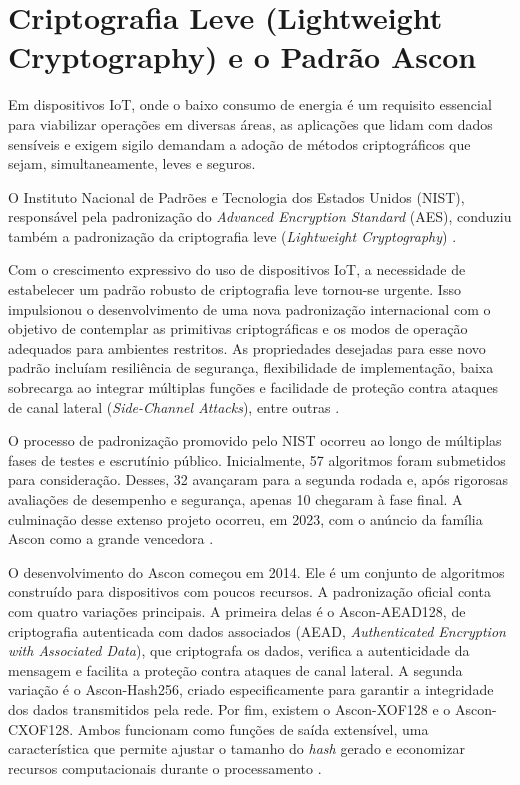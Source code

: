 \section{Criptografia Leve (Lightweight Cryptography) e o Padrão Ascon}
Em dispositivos IoT, onde o baixo consumo de energia é um requisito essencial para viabilizar operações em diversas áreas, as aplicações que lidam com dados sensíveis e exigem sigilo demandam a adoção de métodos criptográficos que sejam, simultaneamente, leves e seguros.

O Instituto Nacional de Padrões e Tecnologia dos Estados Unidos (NIST), responsável pela padronização do \textit{Advanced Encryption Standard} (AES), conduziu também a padronização da criptografia leve (\textit{Lightweight Cryptography}) \cite{chen2022cornerstone}.

Com o crescimento expressivo do uso de dispositivos IoT, a necessidade de estabelecer um padrão robusto de criptografia leve tornou-se urgente. Isso impulsionou o desenvolvimento de uma nova padronização internacional com o objetivo de contemplar as primitivas criptográficas e os modos de operação adequados para ambientes restritos. As propriedades desejadas para esse novo padrão incluíam resiliência de segurança, flexibilidade de implementação, baixa sobrecarga ao integrar múltiplas funções e facilidade de proteção contra ataques de canal lateral (\textit{Side-Channel Attacks}), entre outras \cite{nistir8114}.

O processo de padronização promovido pelo NIST ocorreu ao longo de múltiplas fases de testes e escrutínio público. Inicialmente, 57 algoritmos foram submetidos para consideração. Desses, 32 avançaram para a segunda rodada e, após rigorosas avaliações de desempenho e segurança, apenas 10 chegaram à fase final. A culminação desse extenso projeto ocorreu, em 2023, com o anúncio da família Ascon como a grande vencedora \cite{nistir8454}.

O desenvolvimento do Ascon começou em 2014. Ele é um conjunto de algoritmos construído para dispositivos com poucos recursos. A padronização oficial conta com quatro variações principais. A primeira delas é o Ascon-AEAD128, de criptografia autenticada com dados associados (AEAD, \textit{Authenticated Encryption with Associated Data}), que criptografa os dados, verifica a autenticidade da mensagem e facilita a proteção contra ataques de canal lateral. A segunda variação é o Ascon-Hash256, criado especificamente para garantir a integridade dos dados transmitidos pela rede. Por fim, existem o Ascon-XOF128 e o Ascon-CXOF128. Ambos funcionam como funções de saída extensível, uma característica que permite ajustar o tamanho do \textit{hash} gerado e economizar recursos computacionais durante o processamento \cite{nist2025ascon}.

